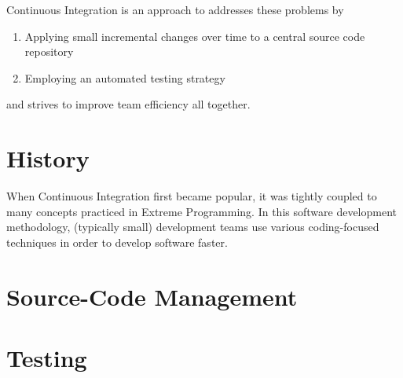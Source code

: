 \documentclass{sig-alternate}
\begin{document}
Continuous Integration is an approach to addresses these problems by
\begin{enumerate}[label=(\alph*)]
    \item Applying small incremental changes over time to a central source code
       repository
    \item Employing an automated testing strategy
\end{enumerate}

and strives to improve team efficiency all together.

\section{History}

When Continuous Integration first became popular, it was tightly coupled to many
concepts practiced in Extreme Programming. In this software development
methodology, (typically small) development teams use various coding-focused
techniques in order to develop software faster.

\section{Source-Code Management}
\section{Testing}



\end{document}
